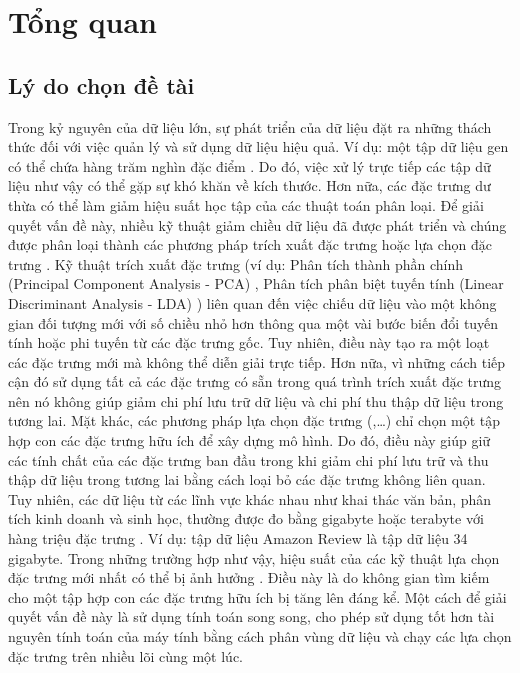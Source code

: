 \chapter{Tổng quan}\label{chapter:tq}

\section{Lý do chọn đề tài}
Trong kỷ nguyên của dữ liệu lớn, sự phát triển của dữ liệu đặt ra những thách thức đối với việc quản lý và sử dụng dữ liệu hiệu quả. Ví dụ: một tập dữ liệu gen có thể chứa hàng trăm nghìn đặc điểm \cite{guyon2007competitive}. Do đó, việc xử lý trực tiếp các tập dữ liệu như vậy có thể gặp sự khó khăn về kích thước. Hơn nữa, các đặc trưng dư thừa có thể làm giảm hiệu suất học tập của các thuật toán phân loại. Để giải quyết vấn đề này, nhiều kỹ thuật giảm chiều dữ liệu đã được phát triển \cite{melab2006grid,de2006parallelizing,garcia2006parallel,guillen2009efficient,lopez2006solving} và chúng được phân loại thành các phương pháp trích xuất đặc trưng hoặc lựa chọn đặc trưng \cite{liu2012feature, kumar2014feature}. Kỹ thuật trích xuất đặc trưng (ví dụ: Phân tích thành phần chính (Principal Component Analysis - PCA) \cite{johnson2002applied}, Phân tích phân biệt tuyến tính (Linear Discriminant Analysis - LDA) \cite{johnson2002applied}) liên quan đến việc chiếu dữ liệu vào một không gian đối tượng mới với số chiều nhỏ hơn thông qua một vài bước biến đổi tuyến tính hoặc phi tuyến từ các đặc trưng gốc. Tuy nhiên, điều này tạo ra một loạt các đặc trưng mới mà không thể diễn giải trực tiếp. Hơn nữa, vì những cách tiếp cận đó sử dụng tất cả các đặc trưng có sẵn trong quá trình trích xuất đặc trưng nên nó không giúp giảm chi phí lưu trữ dữ liệu và chi phí thu thập dữ liệu trong tương lai. Mặt khác, các phương pháp lựa chọn đặc trưng (\cite{sinaga2021entropy, james2013introduction},\ldots) chỉ chọn một tập hợp con các đặc trưng hữu ích để xây dựng mô hình. Do đó, điều này giúp giữ các tính chất của các đặc trưng ban đầu trong khi giảm chi phí lưu trữ và thu thập dữ liệu trong tương lai bằng cách loại bỏ các đặc trưng không liên quan. Tuy nhiên, các dữ liệu từ các lĩnh vực khác nhau như khai thác văn bản, phân tích kinh doanh và sinh học, thường được đo bằng gigabyte hoặc terabyte với hàng triệu đặc trưng \cite{bolon2015feature, li2017feature}. Ví dụ: tập dữ liệu Amazon Review \cite{ni2019justifying} là tập dữ liệu 34 gigabyte. Trong những trường hợp như vậy, hiệu suất của các kỹ thuật lựa chọn đặc trưng mới nhất có thể bị ảnh hưởng  \cite{li2017feature}. Điều này là do không gian tìm kiếm cho một tập hợp con các đặc trưng hữu ích bị tăng lên đáng kể. Một cách để giải quyết vấn đề này là sử dụng tính toán song song, cho phép sử dụng tốt hơn tài nguyên tính toán của máy tính bằng cách phân vùng dữ liệu và chạy các lựa chọn đặc trưng trên nhiều lõi cùng một lúc.


